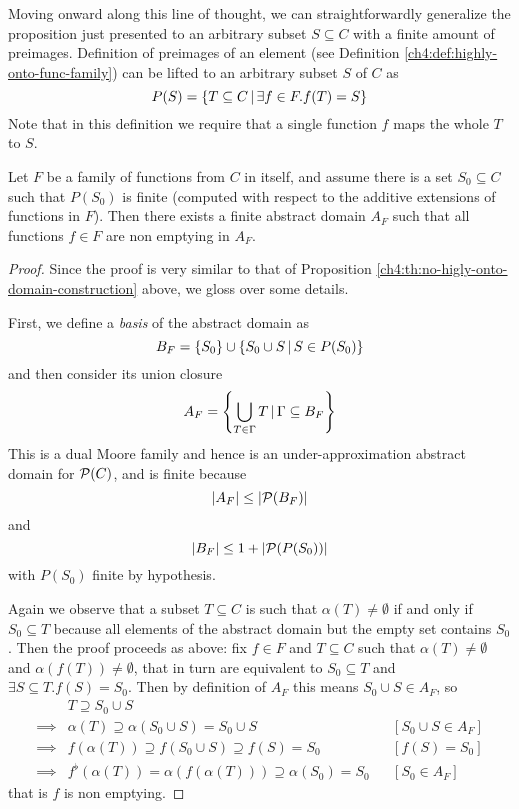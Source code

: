 Moving onward along this line of thought, we can straightforwardly generalize the proposition just presented to an arbitrary subset $S \subseteq C$ with a finite amount of preimages.
Definition of preimages of an element (see Definition \ref{ch4:def:highly-onto-func-family}) can be lifted to an arbitrary subset $S$ of $C$ as
\[
P(S) = \{ T \subseteq C \,\vert\, \exists f \in F. f(T) = S \}
\]
Note that in this definition we require that a single function $f$ maps the whole $T$ to $S$.
\begin{prop}\label{ch4:th:existence-finte-backward}
	Let $F$ be a family of functions from $C$ in itself, and assume there is a set $S_0 \subseteq C$ such that $P(S_0)$ is finite (computed with respect to the additive extensions of functions in $F$). Then there exists a finite abstract domain $A_F$ such that all functions $f \in F$ are non emptying in $A_F$.
\end{prop}
\begin{proof}
	Since the proof is very similar to that of Proposition \ref{ch4:th:no-higly-onto-domain-construction} above, we gloss over some details.

	First, we define a \textit{basis} of the abstract domain as
	\[
	B_F = \{ S_0 \} \cup \{ S_0 \cup S \,\vert\, S \in P(S_0) \}
	\]
	and then consider its union closure
	\[
	A_F = \left\lbrace \bigcup\limits_{T \in \Gamma} T \,\vert\, \Gamma \subseteq B_F \right\rbrace
	\]
	This is a dual Moore family and hence is an under-approximation abstract domain for $\mathcal{P}(C)$, and is finite because
	\[
	\lvert A_F\rvert \le \lvert\mathcal{P}(B_F)\rvert
	\]
	and
	\[
	\lvert B_F\rvert \le 1 + \lvert\mathcal{P}(P(S_0))\rvert
	\]
	with $P(S_0)$ finite by hypothesis.

	Again we observe that a subset $T \subseteq C$ is such that $\alpha(T) \neq \emptyset$ if and only if $S_0 \subseteq T$ because all elements of the abstract domain but the empty set contains $S_0$. Then the proof proceeds as above: fix $f \in F$ and $T \subseteq C$ such that $\alpha(T) \neq \emptyset$ and $\alpha(f(T)) \neq \emptyset$, that in turn are equivalent to $S_0 \subseteq T$ and $\exists S \subseteq T. f(S) = S_0$. Then by definition of $A_F$ this means $S_0 \cup S \in A_F$, so
	\begin{align*}
		&T \supseteq S_0 \cup S && \\
		\implies& \alpha(T) \supseteq \alpha(S_0 \cup S) = S_0 \cup S && [S_0 \cup S \in A_F] \\
		\implies& f(\alpha(T)) \supseteq f(S_0 \cup S) \supseteq f(S) = S_0 && [f(S) = S_0] \\
		\implies& f^{\flat}(\alpha(T)) = \alpha(f(\alpha(T))) \supseteq \alpha(S_0) = S_0 && [S_0 \in A_F]
	\end{align*}
	that is $f$ is non emptying.
\end{proof}


